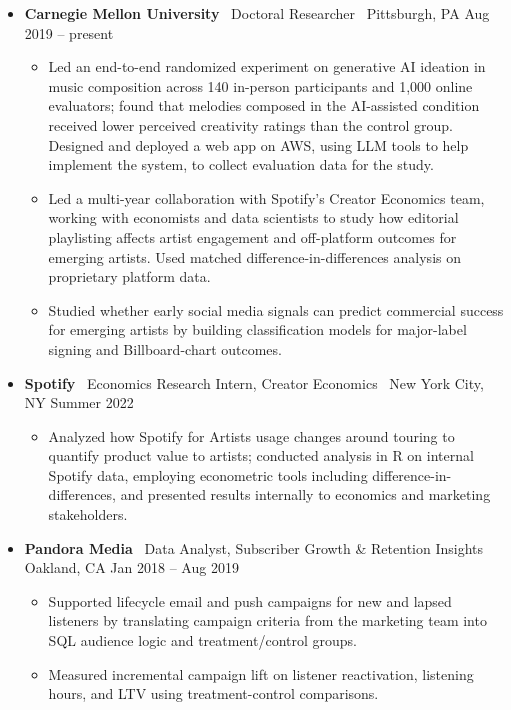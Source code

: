 \documentclass[10pt,letterpaper]{article}
\newcommand{\sep}{{\color{gray}\,\textbullet\,\,}}
\begin{document}
\begin{itemize}[leftmargin=0pt, label={}]
\item \textbf{Carnegie Mellon University} \sep Doctoral Researcher \sep Pittsburgh, PA \hfill Aug 2019 -- present
  \begin{itemize}
  \item Led an end-to-end randomized experiment on generative AI ideation in music composition across 140 in-person participants and 1{,}000 online evaluators; found that melodies composed in the AI-assisted condition received lower perceived creativity ratings than the control group. Designed and deployed a web app on AWS, using LLM tools to help implement the system, to collect evaluation data for the study.
  \item Led a multi-year collaboration with Spotify's Creator Economics team, working with economists and data scientists to study how editorial playlisting affects artist engagement and off-platform outcomes for emerging artists. Used matched difference-in-differences analysis on proprietary platform data.
  \item Studied whether early social media signals can predict commercial success for emerging artists by building classification models for major-label signing and Billboard-chart outcomes.
  \end{itemize}
\item \textbf{Spotify} \sep Economics Research Intern, Creator Economics \sep New York City, NY \hfill Summer 2022
  \begin{itemize}
  \item Analyzed how Spotify for Artists usage changes around touring to quantify product value to artists; conducted analysis in R on internal Spotify data, employing econometric tools including difference-in-differences, and presented results internally to economics and marketing stakeholders.
  \end{itemize}
\item \textbf{Pandora Media} \sep Data Analyst, Subscriber Growth \& Retention Insights \sep Oakland, CA \hfill Jan 2018 -- Aug 2019
  \begin{itemize}
  \item Supported lifecycle email and push campaigns for new and lapsed listeners by translating campaign criteria from the marketing team into SQL audience logic and treatment/control groups.
  \item Measured incremental campaign lift on listener reactivation, listening hours, and LTV using treatment-control comparisons.

\end{itemize}
\end{itemize}
\end{document}
